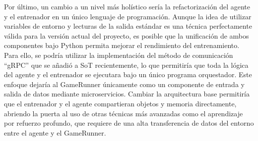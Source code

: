 Por último, un cambio a un nivel más holístico sería la refactorización del agente y el entrenador en un único lenguaje de programación. Aunque la idea de utilizar variables de entorno y lecturas de la salida estándar es una técnica perfectamente válida para la versión actual del proyecto, es posible que la unificación de ambos componentes bajo Python permita mejorar el rendimiento del entrenamiento. Para ello, se podría utilizar la implementación del método de comunicación ``gRPC'' que se añadió a SoT recientemente, lo que permitiría que toda la lógica del agente y el entrenador se ejecutara bajo un único programa orquestador. Este enfoque dejaría al GameRunner únicamente como un componente de entrada y salida de datos mediante microservicios. Cambiar la arquitectura base permitiría que el entrenador y el agente compartieran objetos y memoria directamente, abriendo la puerta al uso de otras técnicas más avanzadas como el aprendizaje por refuerzo profundo, que requiere de una alta transferencia de datos del entorno entre el agente y el GameRunner.